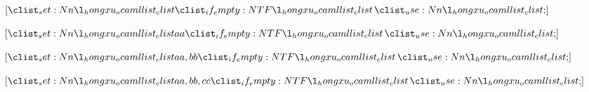 \documentclass{article}
\begin{document}
$\ocamllist{}$

$\ocamllist{aa}$

$\ocamllist{aa,bb}$

$\ocamllist{aa,bb,cc}$
\end{document}
